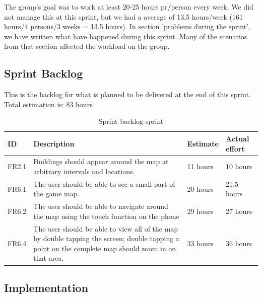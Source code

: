 	The group's goal was to work at least 20-25 hours pr/person every week. We did not manage this at this sprint, but we had a average of 13,5 hours/week (161 hours/4 persons/3 weeks = 13.5 hours). 
	In section 'problems during the sprint', we have written what have happened during this sprint.
	Many of the scenarios from that section affected the workload on the group. 

\subsection{Sprint Backlog}

	This is the backlog for what is planned to be delivered at the end of this sprint.
	Total estimation is: 83 hours

\begin{table}[H]
\begin{tabular}{| p{1cm} | p{7cm} | p{2cm} | p{2cm} |}
	\hline
	\rowcolor{gray}
	ID & Description & Estimate & Actual effort \\ \hline
	FR2.1 & Buildings should appear around the map at arbitrary intervals and locations. 
	& 11 hours & 10 hours \\ \hline
	FR6.1 & The user should be able to see a small part of the game map. 
	& 20 hours & 21.5 hours \\ \hline
	FR6.2 & The user should be able to navigate around the map using the touch function on the phone 
	& 29 hours & 27 hours \\ \hline
	FR6.4 & The user should be able to view all of the map by double tapping the screen; double tapping a point on the complete map should zoom in on that area. 
	& 33 hours & 36 hours \\ \hline
\end{tabular}
\caption{Sprint backlog sprint}
\end{table}

\subsection{Implementation}

